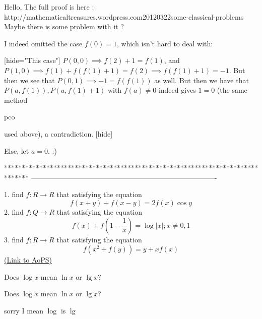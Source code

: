 \begin{solution}
	\begin{tcolorbox}Hello,
The full proof is here : http://mathematicaltreasures.wordpress.com\/2012\/03\/22\/some-classical-problems\/
Maybe there is some problem with it ?\end{tcolorbox}

I indeed omitted the case $f(0)=1$, which isn't hard to deal with:

[hide="This case"]
$P(0, 0)\implies f(2)+1=f(1)$, and $P(1, 0)\implies f(1)+f(f(1)+1)=f(2)\implies f(f(1)+1)=-1$.
But then we see that $P(0, 1)\implies -1=f(f(1))$ as well. But then we have that $P(a, f(1)), P(a, f(1)+1)$ with $f(a)\neq  0$ indeed gives $1=0$ (the same method \begin{bolded}pco\end{bolded} used above), a contradiction.  
[\/hide]

Else, let $a=0$. :)
\end{solution}
*******************************************************************************
-------------------------------------------------------------------------------

\begin{problem}
	1. find $f:R\rightarrow R$ that satisfying the equation
\[f(x+y)+f(x-y)=2f(x)\cos y\]
2. find $f:Q\rightarrow R$ that satisfying the equation
\[f(x)+f(1-\frac{1}{x})=\log |x|;x\not=0,1\]
3. find $f:R\rightarrow R$ that satisfying the equation
\[f(x^2+f(y))=y+xf(x)\]
	\flushright \href{https://artofproblemsolving.com/community/c6h471903}{(Link to AoPS)}
\end{problem}



\begin{solution}
	Does $\log x$ mean $\ln x $ or $\lg x$?
\end{solution}



\begin{solution}
	\begin{tcolorbox}Does $\log x$ mean $\ln x $ or $\lg x$?\end{tcolorbox}
sorry I mean $\log$ is $\lg$
\end{solution}



